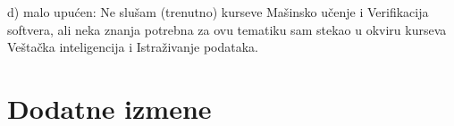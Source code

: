 \documentclass[a4paper]{report}
\begin{document}
d) malo upućen: Ne slušam (trenutno) kurseve Mašinsko učenje i Verifikacija softvera,
ali neka znanja potrebna za ovu tematiku
sam stekao u okviru kurseva Veštačka inteligencija i Istraživanje podataka.


\chapter{Dodatne izmene}
\end{document}
